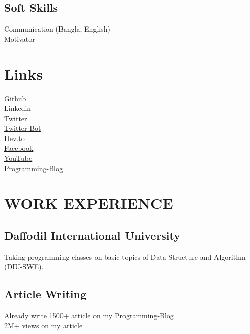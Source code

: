 \documentclass[]{deedy-resume-openfont}
\begin{document}
\begin{minipage}[t]{0.3\textwidth}
\subsection{Soft Skills}
Communication (Bangla, English) \\
Motivator \\
\sectionsep


\section{Links} 
\href{https://github.com/jinnatul}{Github} \\
\href{https://www.linkedin.com/in/jinnatul-islam-morol-b07172143/}{Linkedin} \\
\href{https://twitter.com/jinnatul_md}{Twitter} \\
\href{https://twitter.com/morolswediu}{Twitter-Bot} \\
\href{https://dev.to/jinnatul}{Dev.to} \\
\href{https://www.facebook.com/mdjinnatul.islam/}{Facebook} \\
\href{https://www.youtube.com/channel/UCc9Bj9gAS0wWR0DCvkN3H5Q/videos?view_as=subscriber}{YouTube} \\
\href{http://programming-jinnatul.blogspot.com/}{Programming-Blog} \\


\section{WORK EXPERIENCE}
\subsection{Daffodil International University}
Taking programming classes on basic topics
of Data Structure and Algorithm (DIU-SWE).
\sectionsep

\subsection{Article Writing}
Already write 1500+ article on my \href{http://programming-jinnatul.blogspot.com/}{Programming-Blog} \\
2M+ views on my article
\sectionsep

%
%

\end{minipage} 
\end{document}
